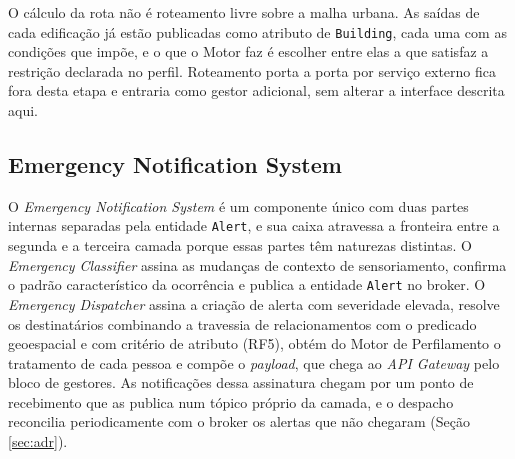 O cálculo da rota não é roteamento livre sobre a malha urbana. As saídas de cada edificação já estão publicadas como atributo de \texttt{Building}, cada uma com as condições que impõe, e o que o Motor faz é escolher entre elas a que satisfaz a restrição declarada no perfil. Roteamento porta a porta por serviço externo fica fora desta etapa e entraria como gestor adicional, sem alterar a interface descrita aqui.

\subsection{Emergency Notification System}

O \textit{Emergency Notification System} é um componente único com duas partes internas separadas pela entidade \texttt{Alert}, e sua caixa atravessa a fronteira entre a segunda e a terceira camada porque essas partes têm naturezas distintas. O \textit{Emergency Classifier} assina as mudanças de contexto de sensoriamento, confirma o padrão característico da ocorrência e publica a entidade \texttt{Alert} no broker. O \textit{Emergency Dispatcher} assina a criação de alerta com severidade elevada, resolve os destinatários combinando a travessia de relacionamentos com o predicado geoespacial e com critério de atributo (RF5), obtém do Motor de Perfilamento o tratamento de cada pessoa e compõe o \textit{payload}, que chega ao \textit{API Gateway} pelo bloco de gestores. As notificações dessa assinatura chegam por um ponto de recebimento que as publica num tópico próprio da camada, e o despacho reconcilia periodicamente com o broker os alertas que não chegaram (Seção \ref{sec:adr}).

